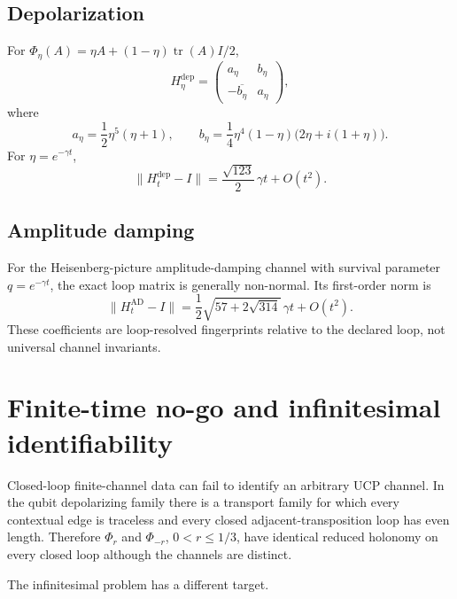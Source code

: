 \documentclass[11pt]{article}
\theoremstyle{definition}
\theoremstyle{remark}
\newcommand{\Tr}{\operatorname{tr}}
\begin{document}
\subsection{Depolarization}
For $\Phi_\eta(A)=\eta A+(1-\eta)\Tr(A)I/2$,
\begin{equation}\label{eq:depolarizing-H}
H_\eta^{\mathrm{dep}}=
\begin{pmatrix}a_\eta&b_\eta\\-\overline{b_\eta}&a_\eta\end{pmatrix},
\end{equation}
where
\[
a_\eta=\frac12\eta^5(\eta+1),\qquad
b_\eta=\frac14\eta^4(1-\eta)\bigl(2\eta+i(1+\eta)\bigr).
\]
For $\eta=e^{-\gamma t}$,
\begin{equation}\label{eq:depolarizing-linear}
\|H_t^{\mathrm{dep}}-I\|=\frac{\sqrt{123}}2\,\gamma t+O(t^2).
\end{equation}

\subsection{Amplitude damping}
For the Heisenberg-picture amplitude-damping channel with survival parameter $q=e^{-\gamma t}$, the exact loop matrix is generally non-normal. Its first-order norm is
\begin{equation}\label{eq:ad-linear}
\|H_t^{\mathrm{AD}}-I\|
=\frac12\sqrt{57+2\sqrt{314}}\,\gamma t+O(t^2).
\end{equation}
These coefficients are loop-resolved fingerprints relative to the declared loop, not universal channel invariants.

\section{Finite-time no-go and infinitesimal identifiability}
Closed-loop finite-channel data can fail to identify an arbitrary UCP channel. In the qubit depolarizing family there is a transport family for which every contextual edge is traceless and every closed adjacent-transposition loop has even length. Therefore $\Phi_r$ and $\Phi_{-r}$, $0<r\le1/3$, have identical reduced holonomy on every closed loop although the channels are distinct.

The infinitesimal problem has a different target.
\end{document}
